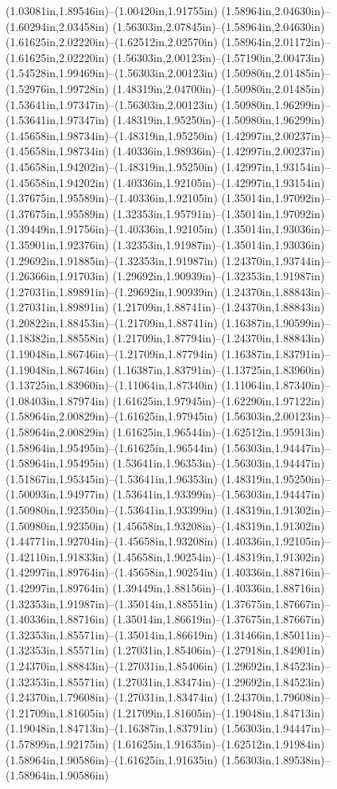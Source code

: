 (1.03081in,1.89546in)--(1.00420in,1.91755in) (1.58964in,2.04630in)--(1.60294in,2.03458in) (1.56303in,2.07845in)--(1.58964in,2.04630in) (1.61625in,2.02220in)--(1.62512in,2.02570in) (1.58964in,2.01172in)--(1.61625in,2.02220in) (1.56303in,2.00123in)--(1.57190in,2.00473in) (1.54528in,1.99469in)--(1.56303in,2.00123in) (1.50980in,2.01485in)--(1.52976in,1.99728in) (1.48319in,2.04700in)--(1.50980in,2.01485in) (1.53641in,1.97347in)--(1.56303in,2.00123in) (1.50980in,1.96299in)--(1.53641in,1.97347in) (1.48319in,1.95250in)--(1.50980in,1.96299in) (1.45658in,1.98734in)--(1.48319in,1.95250in) (1.42997in,2.00237in)--(1.45658in,1.98734in) (1.40336in,1.98936in)--(1.42997in,2.00237in) (1.45658in,1.94202in)--(1.48319in,1.95250in) (1.42997in,1.93154in)--(1.45658in,1.94202in) (1.40336in,1.92105in)--(1.42997in,1.93154in) (1.37675in,1.95589in)--(1.40336in,1.92105in) (1.35014in,1.97092in)--(1.37675in,1.95589in) (1.32353in,1.95791in)--(1.35014in,1.97092in) (1.39449in,1.91756in)--(1.40336in,1.92105in) (1.35014in,1.93036in)--(1.35901in,1.92376in) (1.32353in,1.91987in)--(1.35014in,1.93036in) (1.29692in,1.91885in)--(1.32353in,1.91987in) (1.24370in,1.93744in)--(1.26366in,1.91703in) (1.29692in,1.90939in)--(1.32353in,1.91987in) (1.27031in,1.89891in)--(1.29692in,1.90939in) (1.24370in,1.88843in)--(1.27031in,1.89891in) (1.21709in,1.88741in)--(1.24370in,1.88843in) (1.20822in,1.88453in)--(1.21709in,1.88741in) (1.16387in,1.90599in)--(1.18382in,1.88558in) (1.21709in,1.87794in)--(1.24370in,1.88843in) (1.19048in,1.86746in)--(1.21709in,1.87794in) (1.16387in,1.83791in)--(1.19048in,1.86746in) (1.16387in,1.83791in)--(1.13725in,1.83960in) (1.13725in,1.83960in)--(1.11064in,1.87340in) (1.11064in,1.87340in)--(1.08403in,1.87974in) (1.61625in,1.97945in)--(1.62290in,1.97122in) (1.58964in,2.00829in)--(1.61625in,1.97945in) (1.56303in,2.00123in)--(1.58964in,2.00829in) (1.61625in,1.96544in)--(1.62512in,1.95913in) (1.58964in,1.95495in)--(1.61625in,1.96544in) (1.56303in,1.94447in)--(1.58964in,1.95495in) (1.53641in,1.96353in)--(1.56303in,1.94447in) (1.51867in,1.95345in)--(1.53641in,1.96353in) (1.48319in,1.95250in)--(1.50093in,1.94977in) (1.53641in,1.93399in)--(1.56303in,1.94447in) (1.50980in,1.92350in)--(1.53641in,1.93399in) (1.48319in,1.91302in)--(1.50980in,1.92350in) (1.45658in,1.93208in)--(1.48319in,1.91302in) (1.44771in,1.92704in)--(1.45658in,1.93208in) (1.40336in,1.92105in)--(1.42110in,1.91833in) (1.45658in,1.90254in)--(1.48319in,1.91302in) (1.42997in,1.89764in)--(1.45658in,1.90254in) (1.40336in,1.88716in)--(1.42997in,1.89764in) (1.39449in,1.88156in)--(1.40336in,1.88716in) (1.32353in,1.91987in)--(1.35014in,1.88551in) (1.37675in,1.87667in)--(1.40336in,1.88716in) (1.35014in,1.86619in)--(1.37675in,1.87667in) (1.32353in,1.85571in)--(1.35014in,1.86619in) (1.31466in,1.85011in)--(1.32353in,1.85571in) (1.27031in,1.85406in)--(1.27918in,1.84901in) (1.24370in,1.88843in)--(1.27031in,1.85406in) (1.29692in,1.84523in)--(1.32353in,1.85571in) (1.27031in,1.83474in)--(1.29692in,1.84523in) (1.24370in,1.79608in)--(1.27031in,1.83474in) (1.24370in,1.79608in)--(1.21709in,1.81605in) (1.21709in,1.81605in)--(1.19048in,1.84713in) (1.19048in,1.84713in)--(1.16387in,1.83791in) (1.56303in,1.94447in)--(1.57899in,1.92175in) (1.61625in,1.91635in)--(1.62512in,1.91984in) (1.58964in,1.90586in)--(1.61625in,1.91635in) (1.56303in,1.89538in)--(1.58964in,1.90586in) 